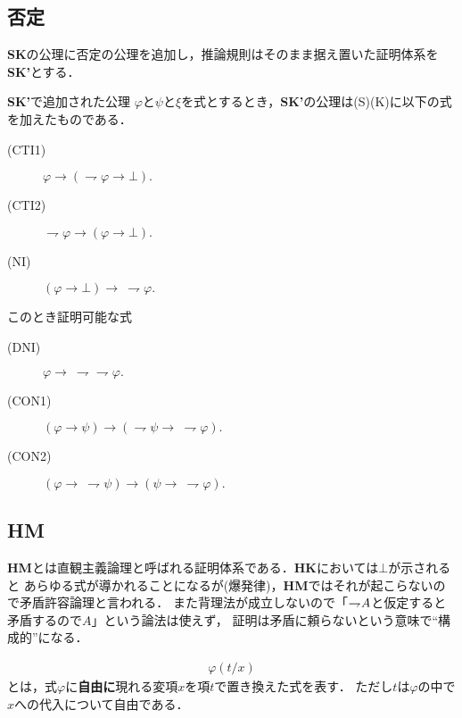 \subsection{否定}
	{\bf SK}の公理に否定の公理を追加し，推論規則はそのまま据え置いた証明体系を{\bf SK'}とする．
	
	\begin{itembox}[l]{{\bf SK'}で追加された公理}
		$\varphi$と$\psi$と$\xi$を式とするとき，{\bf SK'}の公理は(S)(K)に以下の式を加えたものである．
		\begin{description}
			\item[(CTI1)] $\varphi \rightarrow (\rightharpoondown \varphi \rightarrow \bot).$
			
			\item[(CTI2)] $\rightharpoondown \varphi \rightarrow (\varphi \rightarrow \bot).$
			
			\item[(NI)] $(\varphi \rightarrow \bot) \rightarrow\ \rightharpoondown \varphi.$
		\end{description}
	\end{itembox}
	
	このとき証明可能な式
	\begin{description}
		\item[(DNI)] $\varphi \rightarrow\ \rightharpoondown \rightharpoondown \varphi.$
		\item[(CON1)] $(\varphi \rightarrow \psi) \rightarrow (\rightharpoondown \psi \rightarrow\ \rightharpoondown \varphi).$
		\item[(CON2)] $(\varphi \rightarrow\ \rightharpoondown \psi) \rightarrow (\psi \rightarrow\ \rightharpoondown \varphi).$
	\end{description}
	
\subsection{{\bf HM}}
	{\bf HM}とは直観主義論理と呼ばれる証明体系である．{\bf HK}においては$\bot$が示されると
	あらゆる式が導かれることになるが(爆発律)，{\bf HM}ではそれが起こらないので矛盾許容論理と言われる．
	また背理法が成立しないので「$\rightharpoondown\hspace{-0.25em} A$と仮定すると矛盾するので$A$」という論法は使えず，
	証明は矛盾に頼らないという意味で``構成的''になる．
	
	\begin{align}
		\varphi(t/x)
	\end{align}
	とは，式$\varphi$に{\bf 自由に}現れる変項$x$を項$t$で置き換えた式を表す．
	ただし$t$は$\varphi$の中で$x$への代入について自由である．
	
